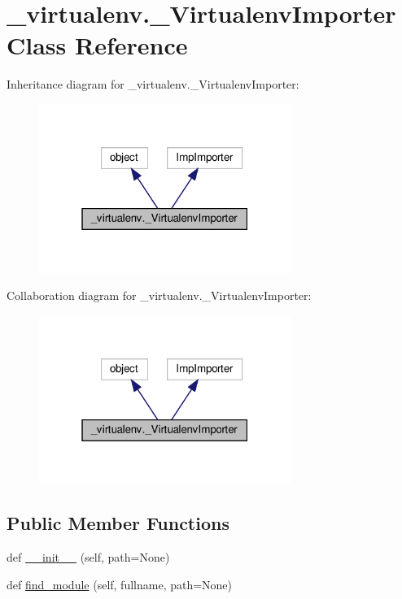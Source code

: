 \hypertarget{class__virtualenv_1_1__VirtualenvImporter}{}\section{\+\_\+virtualenv.\+\_\+\+Virtualenv\+Importer Class Reference}
\label{class__virtualenv_1_1__VirtualenvImporter}


Inheritance diagram for \+\_\+virtualenv.\+\_\+\+Virtualenv\+Importer\+:
\nopagebreak
\begin{figure}[H]
\begin{center}
\leavevmode
\includegraphics[width=232pt]{class__virtualenv_1_1__VirtualenvImporter__inherit__graph}
\end{center}
\end{figure}


Collaboration diagram for \+\_\+virtualenv.\+\_\+\+Virtualenv\+Importer\+:
\nopagebreak
\begin{figure}[H]
\begin{center}
\leavevmode
\includegraphics[width=232pt]{class__virtualenv_1_1__VirtualenvImporter__coll__graph}
\end{center}
\end{figure}
\subsection*{Public Member Functions}
\begin{DoxyCompactItemize}
\item 
def \hyperlink{class__virtualenv_1_1__VirtualenvImporter_a51bd902a6bf731ad04e98b638748405c}{\+\_\+\+\_\+init\+\_\+\+\_\+} (self, path=None)
\item 
def \hyperlink{class__virtualenv_1_1__VirtualenvImporter_ae0afa3f09678a0b164440095ea3cd451}{find\+\_\+module} (self, fullname, path=None)
\end{DoxyCompactItemize}


